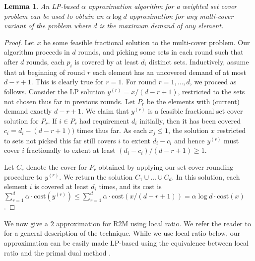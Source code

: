 \documentclass[11pt]{article}
\newtheorem{lemma}[thm]{Lemma}
\begin{document}
\begin{lemma}
\label{setmult}
An LP-based $\alpha$ approximation algorithm for a weighted set cover problem can be used to obtain an $\alpha \log d$ approximation for any multi-cover variant of the problem where $d$ is the maximum demand of any element. 
\end{lemma}
\begin{proof}
Let $x$ be some feasible fractional solution to the multi-cover problem. Our algorithm proceeds in $d$ rounds, and picking 
some sets in each round such that after $d$ rounds, each $p_i$ is covered by at least $d_i$ distinct sets. 
Inductively, assume
that at beginning of round $r$ each element has an uncovered demand of at most $d-r+1$.
This is clearly true for $r = 1$.
For round $r=1,\ldots,d$, we proceed as follows. 
Consider the LP solution $y^{(r)} =x/(d - r + 1)$, restricted to the sets not chosen thus far in previous rounds.
Let $P_r$ be the elements with (current) demand exactly $d-r+1$.
We claim that $y^{(r)}$ is a feasible fractional set cover solution for $P_r$.
If $i \in P_r$ had requirement $d_i$ initially, then it has been covered $c_i=d_i - (d-r+1))$ times thus far. As each $x_j \leq 1$, the solution $x$ restricted to sets not picked this far still covers $i$ to extent $d_i -c_i$ and hence $y^{(r)}$ must cover $i$ fractionally to extent at least $(d_i-c_i)/(d-r+1) \geq 1$. 

Let $C_r$ denote the cover for $P_r$ obtained by applying our set cover rounding procedure to $y^{(r)}$.
We return the solution $C_1 \cup \ldots \cup C_d$. In this solution, each element $i$ is covered at least $d_i$ times, and its cost is $ \sum_{r=1}^d \alpha \cdot \textrm{cost} (y^{(r)}) \leq \sum_{r=1}^d \alpha \cdot \textrm{cost} (x/(d-r+1)) = \alpha \log d \cdot \textrm {cost} (x)$. 
\end{proof}


We now give a $2$ approximation for R2M using local ratio. We refer the reader to \cite{BBF} for a general description of the technique. While we use local ratio below, our approximation can be easily made LP-based
using the equivalence between local ratio and the primal dual method \cite{BR}.
\end{document}

